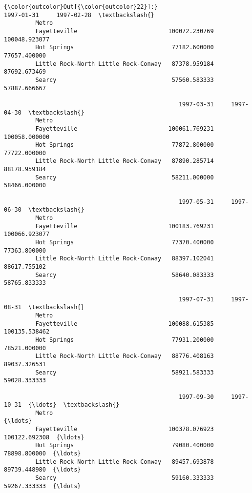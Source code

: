 \documentclass[11pt]{article}
\begin{document}
\begin{Verbatim}[commandchars=\\\{\}]
{\color{outcolor}Out[{\color{outcolor}22}]:}                                          1997-01-31     1997-02-28  \textbackslash{}
         Metro                                                                
         Fayetteville                          100072.230769  100048.923077   
         Hot Springs                            77182.600000   77657.400000   
         Little Rock-North Little Rock-Conway   87378.959184   87692.673469   
         Searcy                                 57560.583333   57887.666667   
         
                                                  1997-03-31     1997-04-30  \textbackslash{}
         Metro                                                                
         Fayetteville                          100061.769231  100058.000000   
         Hot Springs                            77872.800000   77722.000000   
         Little Rock-North Little Rock-Conway   87890.285714   88178.959184   
         Searcy                                 58211.000000   58466.000000   
         
                                                  1997-05-31     1997-06-30  \textbackslash{}
         Metro                                                                
         Fayetteville                          100183.769231  100066.923077   
         Hot Springs                            77370.400000   77363.800000   
         Little Rock-North Little Rock-Conway   88397.102041   88617.755102   
         Searcy                                 58640.083333   58765.833333   
         
                                                  1997-07-31     1997-08-31  \textbackslash{}
         Metro                                                                
         Fayetteville                          100088.615385  100135.538462   
         Hot Springs                            77931.200000   78521.000000   
         Little Rock-North Little Rock-Conway   88776.408163   89037.326531   
         Searcy                                 58921.583333   59028.333333   
         
                                                  1997-09-30     1997-10-31  {\ldots}  \textbackslash{}
         Metro                                                               {\ldots}   
         Fayetteville                          100378.076923  100122.692308  {\ldots}   
         Hot Springs                            79080.400000   78898.800000  {\ldots}   
         Little Rock-North Little Rock-Conway   89457.693878   89739.448980  {\ldots}   
         Searcy                                 59160.333333   59267.333333  {\ldots}   
         

\end{Verbatim}
\end{document}
